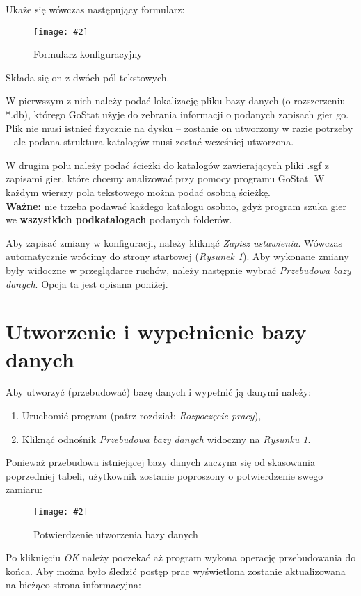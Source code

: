 \documentclass[10pt,leqno]{article}
\newcommand{\myimage}[3]{
  \begin{figure}[h!]
    \centering
      \texttt{[image: \#2]}
  \caption{#3}
  \end{figure}
}
\begin{document}
Ukaże się wówczas następujący formularz:

\myimage{0.4}{formularz.png}{Formularz konfiguracyjny}

Składa się on z dwóch pól tekstowych. 

W pierwszym z nich należy podać lokalizację pliku bazy danych (o rozszerzeniu *.db), którego GoStat użyje do zebrania informacji o podanych zapisach gier go.
Plik nie musi istnieć fizycznie na dysku -- zostanie on utworzony w razie potrzeby -- ale podana struktura katalogów musi zostać wcześniej utworzona.

W drugim polu należy podać ścieżki do katalogów zawierających pliki .sgf z zapisami gier, które chcemy analizować przy pomocy
programu GoStat. W każdym wierszy pola tekstowego można podać osobną ścieżkę. \\
\textbf{Ważne:} nie trzeba podawać każdego katalogu osobno, gdyż program szuka gier we \textbf{wszystkich podkatalogach} podanych folderów.

Aby zapisać zmiany w konfiguracji, należy kliknąć \emph{Zapisz ustawienia}. Wówczas automatycznie wrócimy do strony startowej (\emph{Rysunek 1}). 
Aby wykonane zmiany były widoczne w przeglądarce ruchów, należy następnie wybrać \emph{Przebudowa bazy danych}. Opcja ta jest opisana poniżej.

\newpage

\section{Utworzenie i wypełnienie bazy danych}
Aby utworzyć (przebudować) bazę danych i wypełnić ją danymi należy: 
\begin{enumerate}
\item Uruchomić program (patrz rozdział: \emph{Rozpoczęcie pracy}),
\item Kliknąć odnośnik \emph{Przebudowa bazy danych} widoczny na \emph{Rysunku 1}.
\end{enumerate}

Ponieważ przebudowa istniejącej bazy danych zaczyna się od skasowania poprzedniej tabeli, użytkownik zostanie
poproszony o potwierdzenie swego zamiaru:

\myimage{1.0}{potwierdzenie.png}{Potwierdzenie utworzenia bazy danych}

Po kliknięciu \emph{OK} należy poczekać aż program wykona operację przebudowania do końca. 
Aby można było śledzić postęp prac wyświetlona zostanie aktualizowana na bieżąco strona informacyjna:
\end{document}
